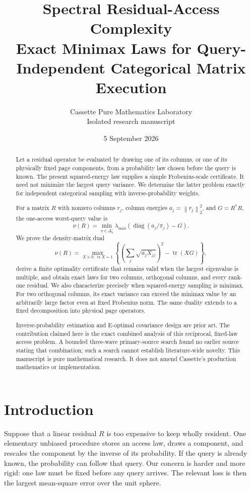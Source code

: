 \documentclass[11pt]{article}
\title{\textbf{Spectral Residual-Access Complexity}\\
\large Exact Minimax Laws for Query-Independent Categorical Matrix Execution}
\author{Cassette Pure Mathematics Laboratory\\
\small Isolated research manuscript}
\date{5 September 2026}
\theoremstyle{definition}
\newcommand{\tr}{\operatorname{tr}}
\newcommand{\diag}{\operatorname{diag}}
\newcommand{\norm}[1]{\left\lVert #1\right\rVert}
\begin{document}
\maketitle

\begin{abstract}
Let a residual operator be evaluated by drawing one of its columns, or one of its physically
fixed page components, from a probability law chosen before the query is known.  The present
squared-energy law supplies a simple Frobenius-scale certificate.  It need not minimize the
largest query variance.  We determine the latter problem exactly for independent categorical
sampling with inverse-probability weights.

For a matrix $R$ with nonzero columns $r_j$, column energies $a_j=\norm{r_j}_2^2$, and
$G=R^*R$, the one-access worst-query value is
\[
  \nu(R)=\min_{\pi\in\Delta_q^\circ}
  \lambda_{\max}\!\left(\diag(a_j/\pi_j)-G\right).
\]
We prove the density-matrix dual
\[
  \nu(R)=\max_{X\succeq0,\,\tr X=1}
  \left\{\left(\sum_j\sqrt{a_jX_{jj}}\right)^2-\tr(XG)\right\},
\]
derive a finite optimality certificate that remains valid when the largest eigenvalue is
multiple, and obtain exact laws for two columns, orthogonal columns, and every rank-one residual.
We also characterize precisely when squared-energy sampling is minimax.  For two orthogonal
columns, its exact variance can exceed the minimax value by an arbitrarily large factor even at
fixed Frobenius norm.  The same duality extends to a fixed decomposition into physical page
operators.

Inverse-probability estimation and E-optimal covariance design are prior art.  The contribution
claimed here is the exact combined analysis of this reciprocal, fixed-law access problem.  A
bounded three-wave primary-source search found no earlier source stating that combination; such a
search cannot establish literature-wide novelty.  This manuscript is pure mathematical research.
It does not amend Cassette's production mathematics or implementation.
\end{abstract}

\section{Introduction}

Suppose that a linear residual $R$ is too expensive to keep wholly resident.  One elementary
unbiased procedure stores an access law, draws a component, and rescales the component by the
inverse of its probability.  If the query is already known, the probability can follow that
query.  Our concern is harder and more rigid: one law must be fixed before any query arrives.
The relevant loss is then the largest mean-square error over the unit sphere.
\end{document}
